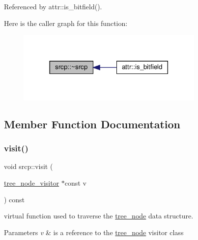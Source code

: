 Referenced by attr\+::is\+\_\+bitfield().

Here is the caller graph for this function\+:
\nopagebreak
\begin{figure}[H]
\begin{center}
\leavevmode
\includegraphics[width=260pt]{d4/dd2/structsrcp_aa5ff584515aeb30cda33c01f58b2a02f_icgraph}
\end{center}
\end{figure}


\subsection{Member Function Documentation}
\mbox{\label{structsrcp_a1cd5943380f069e6ed0a33566af2566d}} 
\subsubsection{\texorpdfstring{visit()}{visit()}}
{\footnotesize\ttfamily void srcp\+::visit (\begin{DoxyParamCaption}\item[{\hyperlink{classtree__node__visitor}{tree\+\_\+node\+\_\+visitor} $\ast$const}]{v }\end{DoxyParamCaption}) const\hspace{0.3cm}{\ttfamily [virtual]}}



virtual function used to traverse the \hyperlink{classtree__node}{tree\+\_\+node} data structure. 


\begin{DoxyParams}{Parameters}
{\em v} & is a reference to the \hyperlink{classtree__node}{tree\+\_\+node} visitor class \\
\hline
\end{DoxyParams}


